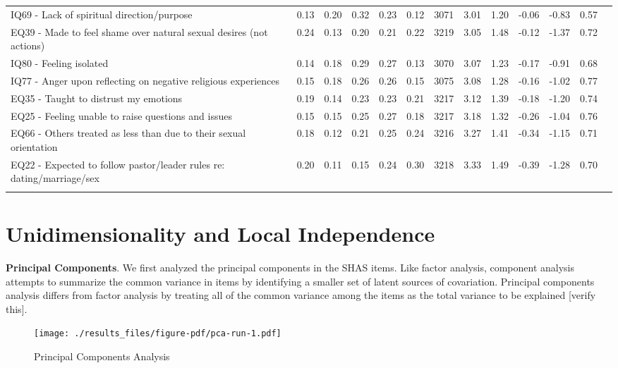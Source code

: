 \documentclass[
  letterpaper,
  DIV=11,
  numbers=noendperiod]{scrreport}
\begin{document}
\begin{longtable}[t]{>{\raggedright\arraybackslash}p{2cm}cccccccccccc}
IQ69 - Lack of spiritual direction/purpose & 0.13 & 0.20 & 0.32 & 0.23 & 0.12 & 3071 & 3.01 & 1.20 & -0.06 & -0.83 & 0.57 & \\
EQ39 - Made to feel shame over natural sexual desires (not actions) & 0.24 & 0.13 & 0.20 & 0.21 & 0.22 & 3219 & 3.05 & 1.48 & -0.12 & -1.37 & 0.72 & \\
\addlinespace
IQ80 - Feeling isolated & 0.14 & 0.18 & 0.29 & 0.27 & 0.13 & 3070 & 3.07 & 1.23 & -0.17 & -0.91 & 0.68 & \\
IQ77 - Anger upon reflecting on negative religious experiences & 0.15 & 0.18 & 0.26 & 0.26 & 0.15 & 3075 & 3.08 & 1.28 & -0.16 & -1.02 & 0.77 & \\
EQ35 - Taught to distrust my emotions & 0.19 & 0.14 & 0.23 & 0.23 & 0.21 & 3217 & 3.12 & 1.39 & -0.18 & -1.20 & 0.74 & \\
EQ25 - Feeling unable to raise questions and issues & 0.15 & 0.15 & 0.25 & 0.27 & 0.18 & 3217 & 3.18 & 1.32 & -0.26 & -1.04 & 0.76 & \\
EQ66 - Others treated as less than due to their sexual orientation & 0.18 & 0.12 & 0.21 & 0.25 & 0.24 & 3216 & 3.27 & 1.41 & -0.34 & -1.15 & 0.71 & \\
\addlinespace
EQ22 - Expected to follow pastor/leader rules re: dating/marriage/sex & 0.20 & 0.11 & 0.15 & 0.24 & 0.30 & 3218 & 3.33 & 1.49 & -0.39 & -1.28 & 0.70 & \\*
\end{longtable}

\hypertarget{unidimensionality-and-local-independence}{%
\section*{Unidimensionality and Local
Independence}\label{unidimensionality-and-local-independence}}

\textbf{Principal Components}. We first analyzed the principal
components in the SHAS items. Like factor analysis, component analysis
attempts to summarize the common variance in items by identifying a
smaller set of latent sources of covariation. Principal components
analysis differs from factor analysis by treating all of the common
variance among the items as the total variance to be explained {[}verify
this{]}.

\begin{figure}

{\centering \texttt{[image: ./results\_files/figure-pdf/pca-run-1.pdf]}

}

\caption{Principal Components Analysis}

\end{figure}
\end{document}

